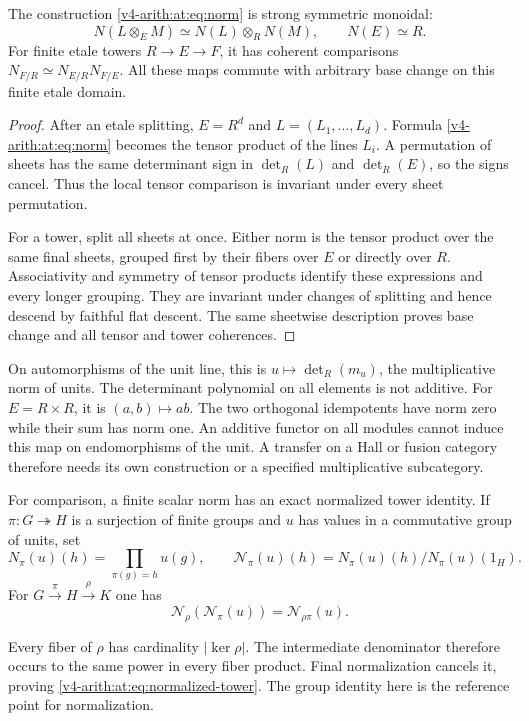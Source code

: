 \begin{theorem}
\label{v4-arith:at:thm:norm}
The construction \eqref{v4-arith:at:eq:norm} is strong symmetric monoidal:
\[
 N(L\otimes_EM)\simeq N(L)\otimes_RN(M),\qquad N(E)\simeq R.
\]
For finite etale towers $R\to E\to F$, it has coherent comparisons
$N_{F/R}\simeq N_{E/R}N_{F/E}$. All these maps commute with
arbitrary base change on this finite etale domain.
\end{theorem}
\begin{proof}
After an etale splitting, $E=R^d$ and
$L=(L_1,\ldots,L_d)$. Formula \eqref{v4-arith:at:eq:norm} becomes the
tensor product of the lines $L_i$. A permutation of sheets has
the same determinant sign in $\det_R(L)$ and $\det_R(E)$, so
the signs cancel. Thus the local tensor comparison is invariant
under every sheet permutation.

For a tower, split all sheets at once. Either norm is the tensor
product over the same final sheets, grouped first by their fibers
over $E$ or directly over $R$. Associativity and symmetry of tensor
products identify these expressions and every longer grouping.
They are invariant under changes of splitting and hence descend
by faithful flat descent. The same sheetwise description proves
base change and all tensor and tower coherences.
\end{proof}

On automorphisms of the unit line, this is
$u\mapsto\det_R(m_u)$, the multiplicative norm of units.
The determinant polynomial on all elements is not additive.
For \(E=R\times R\), it is \((a,b)\mapsto ab\).
The two orthogonal idempotents have norm zero while their sum
has norm one.
An additive functor on all modules cannot induce this map on
endomorphisms of the unit. A transfer on a Hall or fusion category
therefore needs its own construction or a specified multiplicative
subcategory.

For comparison, a finite scalar norm has an exact normalized tower
identity. If $\pi:G\twoheadrightarrow H$ is a surjection of finite
groups and $u$ has values in a commutative group of units, set
\[
 N_\pi(u)(h)=\prod_{\pi(g)=h}u(g),\qquad
 \mathcal N_\pi(u)(h)=N_\pi(u)(h)/N_\pi(u)(1_H).
\]
For $G\xrightarrow\pi H\xrightarrow\rho K$ one has
\begin{equation}\label{v4-arith:at:eq:normalized-tower}
 \mathcal N_\rho(\mathcal N_\pi(u))=\mathcal N_{\rho\pi}(u).
\end{equation}

Every fiber of \(\rho\) has cardinality \(|\ker\rho|\).
The intermediate denominator therefore occurs to the same power
in every fiber product. Final normalization cancels it, proving
\eqref{v4-arith:at:eq:normalized-tower}.
The group identity here is the reference point for normalization.

